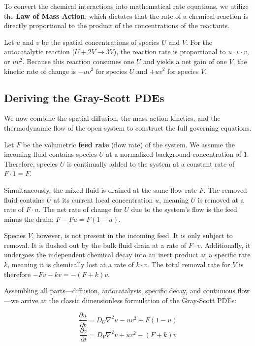 \documentclass[12pt,a4paper]{article}
\begin{document}
To convert the chemical interactions into mathematical rate equations, we utilize the \textbf{Law of Mass Action}, which dictates that the rate of a chemical reaction is directly proportional to the product of the concentrations of the reactants.

Let $u$ and $v$ be the spatial concentrations of species $U$ and $V$. For the autocatalytic reaction ($U + 2V \rightarrow 3V$), the reaction rate is proportional to $u \cdot v \cdot v$, or $u v^2$. Because this reaction consumes one $U$ and yields a net gain of one $V$, the kinetic rate of change is $-u v^2$ for species $U$ and $+u v^2$ for species $V$.

\subsection{Deriving the Gray-Scott PDEs}
We now combine the spatial diffusion, the mass action kinetics, and the thermodynamic flow of the open system to construct the full governing equations. 

Let $F$ be the volumetric \textbf{feed rate} (flow rate) of the system. We assume the incoming fluid contains species $U$ at a normalized background concentration of $1$. Therefore, species $U$ is continually added to the system at a constant rate of $F \cdot 1 = F$. 

Simultaneously, the mixed fluid is drained at the same flow rate $F$. The removed fluid contains $U$ at its current local concentration $u$, meaning $U$ is removed at a rate of $F \cdot u$. The net rate of change for $U$ due to the system's flow is the feed minus the drain: $F - Fu = F(1 - u)$.

Species $V$, however, is not present in the incoming feed. It is only subject to removal. It is flushed out by the bulk fluid drain at a rate of $F \cdot v$. Additionally, it undergoes the independent chemical decay into an inert product at a specific rate $k$, meaning it is chemically lost at a rate of $k \cdot v$. The total removal rate for $V$ is therefore $-Fv - kv = -(F + k)v$.

Assembling all parts—diffusion, autocatalysis, specific decay, and continuous flow—we arrive at the classic dimensionless formulation of the Gray-Scott PDEs:

$$\frac{\partial u}{\partial t} = D_U \nabla^2 u - u v^2 + F(1 - u)$$
$$\frac{\partial v}{\partial t} = D_V \nabla^2 v + u v^2 - (F + k)v$$
\end{document}
